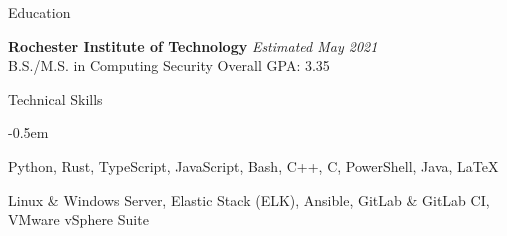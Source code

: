 \documentclass[8pt]{resume} %
\begin{document}

\begin{rSection}{Education}

{\bf Rochester Institute of Technology} \hfill {\em Estimated May 2021} \\ 
B.S./M.S. in Computing Security \hfill Overall GPA: 3.35

\end{rSection}


\begin{rSection}{Technical Skills}

    \begin{multicols}{2}[]

    \begin{description}
        \itemsep -0.5em
        \item[Languages] Python, Rust, TypeScript, JavaScript, Bash, C++, C, PowerShell, Java, \LaTeX
        \item[Tools/Software] Linux \& Windows Server, Elastic Stack (ELK), Ansible, GitLab \& GitLab CI, VMware vSphere Suite
    \end{description}

    \end{multicols}

\end{rSection}

\end{document}
